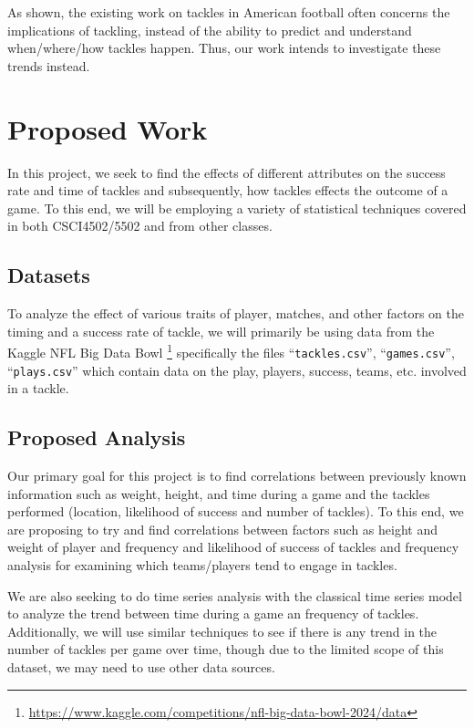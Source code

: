 \documentclass[sigconf, hyperref={colorlinks=true,linkcolor=blue,urlcolor=blue}]{acmart}
\begin{document}
As shown, the existing work on tackles in American football often concerns the implications of
tackling, instead of the ability to predict and understand when/where/how tackles happen.
Thus, our work intends to investigate these trends instead.

\section{Proposed Work}

In this project, we seek to find the effects of different attributes on the
success rate and time of tackles and subsequently, how tackles effects the outcome
of a game.
To this end, we will be employing a variety of statistical techniques covered in
both CSCI4502/5502 and from other classes.

\subsection{Datasets}
To analyze the effect of various traits of player, matches, and other factors on
the timing and a success rate of tackle, we will primarily be using data from
the Kaggle NFL Big Data Bowl
\footnote{\url{https://www.kaggle.com/competitions/nfl-big-data-bowl-2024/data}}
specifically the files ``\verb|tackles.csv|'', ``\verb|games.csv|'',
``\verb|plays.csv|'' which contain data on the play, players, success, teams,
etc. involved in a tackle.

\subsection{Proposed Analysis}
Our primary goal for this project is to find correlations between previously
known information such as weight, height, and time during a game and the tackles
performed (location, likelihood of success and number of tackles). To this end,
we are proposing to try and find correlations between factors such as height and
weight of player and frequency and likelihood of success of tackles and
frequency analysis for examining which teams/players tend to engage in tackles.

We are also seeking to do time series analysis with the classical time series
model to analyze the trend between time during a game an frequency of
tackles. Additionally, we will use similar techniques to see if there is any
trend in the number of tackles per game over time, though due to the limited
scope of this dataset, we may need to use other data sources.
\end{document}
